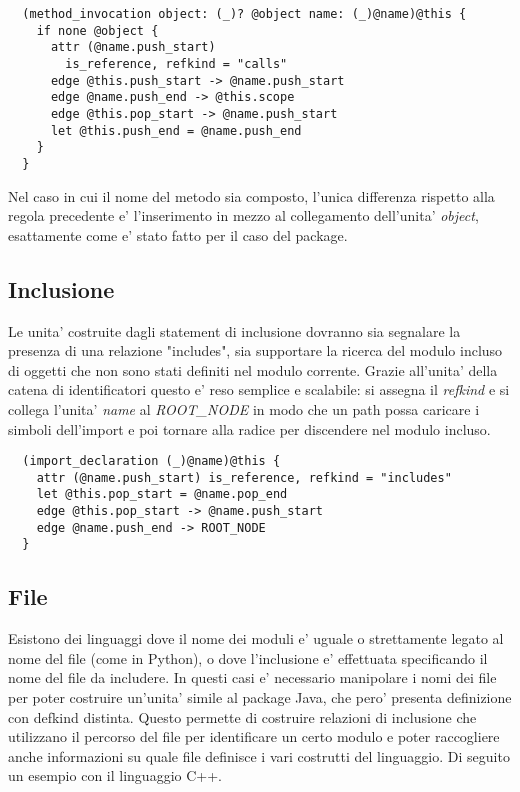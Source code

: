 \begin{lstlisting}
  (method_invocation object: (_)? @object name: (_)@name)@this {
    if none @object {
      attr (@name.push_start)
        is_reference, refkind = "calls"
      edge @this.push_start -> @name.push_start
      edge @name.push_end -> @this.scope
      edge @this.pop_start -> @name.push_start
      let @this.push_end = @name.push_end
    }
  }
\end{lstlisting}

Nel caso in cui il nome del metodo sia composto, l'unica differenza rispetto alla regola precedente e' l'inserimento in mezzo al collegamento dell'unita' \emph{object}, esattamente come e' stato fatto per il caso del package.

\subsection{Inclusione}

Le unita' costruite dagli statement di inclusione dovranno sia segnalare la presenza di una relazione "includes", sia supportare la ricerca del modulo incluso di oggetti che non sono stati definiti nel modulo corrente.
Grazie all'unita' della catena di identificatori questo e' reso semplice e scalabile: si assegna il \emph{refkind} e si collega l'unita' \emph{name} al \emph{ROOT\_NODE} in modo che un path possa caricare i simboli dell'import e poi tornare alla radice per discendere nel modulo incluso.

\begin{lstlisting}
  (import_declaration (_)@name)@this {
    attr (@name.push_start) is_reference, refkind = "includes"
    let @this.pop_start = @name.pop_end
    edge @this.pop_start -> @name.push_start
    edge @name.push_end -> ROOT_NODE
  }
\end{lstlisting}

\subsection{File}

Esistono dei linguaggi dove il nome dei moduli e' uguale o strettamente legato al nome del file (come in Python), o dove l'inclusione e' effettuata specificando il nome del file da includere.
In questi casi e' necessario manipolare i nomi dei file per poter costruire un'unita' simile al package Java, che pero' presenta definizione con defkind distinta.
Questo permette di costruire relazioni di inclusione che utilizzano il percorso del file per identificare un certo modulo e poter raccogliere anche informazioni su quale file definisce i vari costrutti del linguaggio.
Di seguito un esempio con il linguaggio C++.


